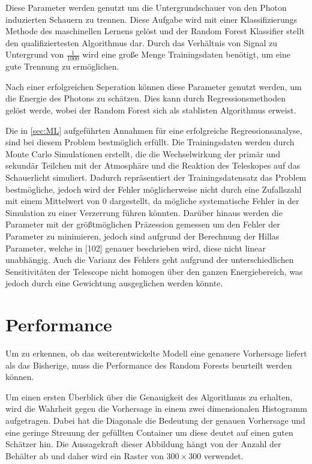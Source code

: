Diese Parameter werden genutzt um die Untergrundschauer von den Photon induzierten Schauern zu trennen.
Diese Aufgabe wird mit einer Klassifizierungs Methode des maschinellen Lernens gelöst und der
Random Forest Klassifier stellt den qualifiziertesten Algorithmus dar.
Durch das Verhältnis von Signal zu Untergrund von $\frac{1}{1000}$\cite{Cherenkov_Licht} wird eine große Menge Trainingsdaten
benötigt, um eine gute Trennung zu ermöglichen.

Nach einer erfolgreichen Seperation können diese Parameter genutzt werden, um die Energie des Photons zu schätzen.
Dies kann durch Regressionsmethoden gelöst werde, wobei der Random Forest sich als stablisten Algorithmus erweist\cite{Cherenkov_Licht}.

Die in \autoref{sec:ML} aufgeführten Annahmen für eine erfolgreiche Regressionsanalyse, sind bei diesem Problem bestmöglich erfüllt. Die Trainingsdaten
werden durch Monte Carlo Simulationen erstellt, die die Wechselwirkung der primär und sekundär Teilchen mit der Atmosphäre und die Reaktion des Teleskopes
auf das Schauerlicht simuliert.
Dadurch repräsentiert der Trainingsdatensatz das Problem bestmögliche, jedoch wird der Fehler möglicherweise nicht durch eine Zufallszahl mit einem Mittelwert von $0$ dargestellt, da
mögliche systematische Fehler in der Simulation zu einer Verzerrung führen könnten.
Darüber hinaus werden die Parameter mit der größtmöglichen Präzession gemessen um den Fehler der Parameter zu minimieren,
jedoch sind aufgrund der Berechnung der Hillas Parameter, welche in [102]\cite{HESS}
genauer beschrieben wird, diese nicht linear unabhängig.
Auch die Varianz des Fehlers geht aufgrund der unterschiedlichen Sensitivitäten der Telescope nicht homogen
über den ganzen Energiebereich, was jedoch durch eine Gewichtung ausgeglichen werden könnte.

\section{Performance}
\label{sec:Per}

Um zu erkennen, ob das weiterentwickelte Modell eine genauere Vorhersage liefert als das Bisherige, muss die
Performance des Random Forests beurteilt werden können.

Um einen ersten Überblick über die Genauigkeit des Algorithmus zu erhalten, wird die Wahrheit gegen die Vorhersage in einem
zwei dimensionalen Histogramm aufgetragen.
Dabei hat die Diagonale die Bedeutung der genauen Vorhersage und eine geringe Streuung der gefüllten Container
um diese deutet auf einen guten Schätzer hin.
Die Aussagekraft dieser Abbildung hängt von der Anzahl der Behälter ab und daher wird ein Raster von $300 \times 300$ verwendet.

